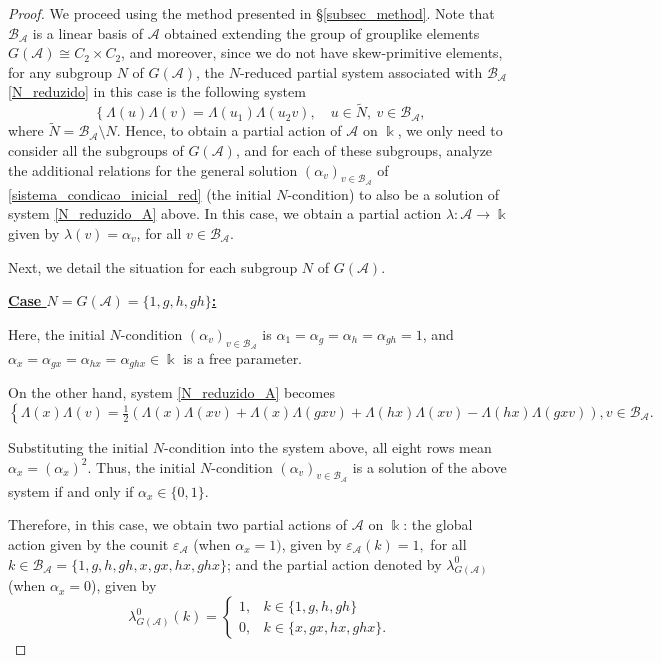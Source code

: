 \documentclass[reqno]{amsart}
\theoremstyle{definition}
\numberwithin{equation}{section}\theoremstyle{plain}
\newcommand{\B}{\mathcal{B}}
\theoremstyle{definition}
\def \k {\Bbbk}
\def \A {\mathcal{A}}
\begin{document}
\begin{proof}
We proceed using the method presented in \S \ref{subsec_method}.
Note that $\B_\A$ is a linear basis of $\A$ obtained extending the group of grouplike elements $G(\A) \cong C_2 \times C_2$, and moreover, since we do not have skew-primitive elements, for any subgroup $N$ of $G(\A)$, the $N$-reduced partial system associated with $\B_\A$ \eqref{N_reduzido} in this case is the following system
\begin{equation}\label{N_reduzido_A}
\left\{\Lambda(u)\Lambda(v) = \Lambda(u_1)\Lambda(u_2 v),
\right. \quad u \in \widetilde{N},\ v \in \B_\A,
\end{equation}
where \(\widetilde{N} = \B_\A \setminus N\).
Hence, to obtain a partial action of $\A$ on $\k$, we only need to consider all the subgroups of $G(\A)$, and for each of these subgroups, analyze the additional relations for the general solution \((\alpha_v)_{v \in \B_\A}\) of \eqref{sistema_condicao_inicial_red} (the initial $N$-condition) to also be a solution of system \eqref{N_reduzido_A} above.
In this case, we obtain a partial action $\lambda: \A \to \k$ given by $\lambda(v)=\alpha_v$, for all $v \in \mathcal{B}_\A$.

\smallbreak

Next, we detail the situation for each subgroup $N$ of $G(\A)$.

\medbreak

\textbf{\underline{Case $N=G(\A)=\{1, g, h, gh\}$:}}

\smallbreak

Here, the initial $N$-condition $(\alpha_v)_{v \in \B_\A}$ is $\alpha_1 = \alpha_g = \alpha_h = \alpha_{gh} = 1$,  and $\alpha_x=\alpha_{gx} = \alpha_{hx} =  \alpha_{ghx} \in \k$ is a free parameter.

On the other hand, system \eqref{N_reduzido_A} becomes 
\begin{equation*}
\left\{
\Lambda(x)\Lambda(v) 
 = \tfrac{1}{2}\left( \Lambda({x})\Lambda({x} v) + \Lambda({x})\Lambda({gx} v) + \Lambda({hx})\Lambda({x} v) - \Lambda({hx})\Lambda({gx} v) \right), 
\right. v \in  \B_\A.
\end{equation*}

Substituting the initial $N$-condition into the system above, all eight rows mean $\alpha_x  = (\alpha_x)^2$.
Thus, the initial $N$-condition $(\alpha_v)_{v \in \B_\A}$ is a solution of the above system if and only if $\alpha_x \in \{0,1\}$.

Therefore, in this case, we obtain two partial actions of $\A$ on $\k$: the global action given by the counit $\varepsilon_\A$ (when $\alpha_x=1)$, given by $\varepsilon_\A(k) = 1,$ for all $k \in \B_\A=\{1, g, h, gh, x, gx, hx, ghx\}$; and the partial action denoted by $\lambda_{G(\A)}^0$ (when $\alpha_x=0$), given by 
\[
 \lambda_{G(\A)}^0 (k)=
     \begin{cases}
         1, &  k \in \{1, g, h, gh\} \\
         0, &  k \in \{x, gx, hx, ghx\}.
     \end{cases}
\]


\end{proof}
\end{document}
